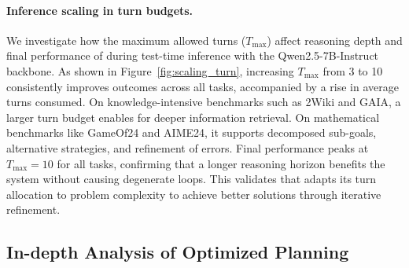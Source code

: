 \begin{table}
    \centering
    \vspace{3pt}
    \footnotesize
    
    
    \vspace{-2mm} %
    \caption{Average turns with increased $T_{\text{max}}$.}
    \label{tab:scaling_turn} %
    \vspace{-5mm} %
\end{table}

\paragraph{Inference scaling in turn budgets.}
We investigate how the maximum allowed turns ($T_{\text{max}}$) affect reasoning depth and final performance of \model during test-time inference with the Qwen2.5-7B-Instruct backbone. As shown in Figure~\ref{fig:scaling_turn}, increasing $T_{\text{max}}$ from 3 to 10 consistently improves outcomes across all tasks, accompanied by a rise in average turns consumed. On knowledge-intensive benchmarks such as 2Wiki and GAIA, a larger turn budget enables \model for deeper information retrieval. On mathematical benchmarks like GameOf24 and AIME24, it supports decomposed sub-goals, alternative strategies, and refinement of errors. Final performance peaks at $T_{\text{max}}=10$ for all tasks, confirming that a longer reasoning horizon benefits the system without causing degenerate loops. This validates that \model adapts its turn allocation to problem complexity to achieve better solutions through iterative refinement.


\subsection{In-depth Analysis of Optimized Planning}
\label{subsec:optimized_planning}

